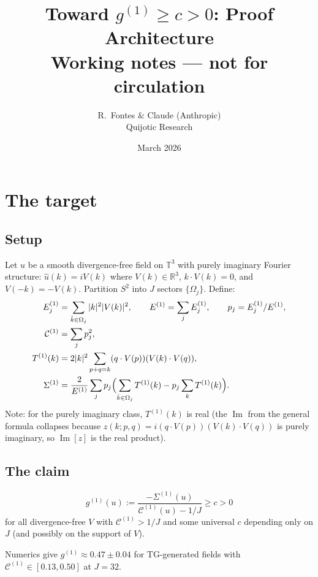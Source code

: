 \documentclass[11pt]{article}
\title{Toward $g^{(1)}\geq c > 0$: Proof Architecture\\
{\large Working notes --- not for circulation}}
\author{R.\ Fontes \& Claude (Anthropic)\\
Quijotic Research}
\date{March 2026}
\theoremstyle{definition}
\newcommand{\R}{\mathbb{R}}
\newcommand{\T}{\mathbb{T}}
\newcommand{\cC}{\mathcal{C}}
\DeclareMathOperator{\im}{Im}
\begin{document}
\maketitle

\section{The target}

\subsection{Setup}

Let $u$ be a smooth divergence-free field on $\T^3$
with purely imaginary Fourier structure:
$\hat u(k) = iV(k)$ where $V(k)\in\R^3$,
$k\cdot V(k)=0$, and $V(-k)=-V(k)$.
Partition $S^2$ into $J$ sectors $\{\Omega_j\}$.
Define:
\begin{align}
E_j^{(1)} &= \sum_{\hat k\in\Omega_j}|k|^2|V(k)|^2,
\qquad E^{(1)} = \sum_j E_j^{(1)}, \qquad
p_j = E_j^{(1)}/E^{(1)}, \\
\cC^{(1)} &= \sum_j p_j^2, \\
T^{(1)}(k) &= 2|k|^2\sum_{p+q=k}
(q\cdot V(p))(V(k)\cdot V(q)),
\label{eq:T1}\\
\Sigma^{(1)} &= \frac{2}{E^{(1)}}
\sum_j p_j\Bigl(\sum_{\hat k\in\Omega_j}T^{(1)}(k)
- p_j\sum_k T^{(1)}(k)\Bigr).
\label{eq:Sigma1}
\end{align}
Note: for the purely imaginary class,
$T^{(1)}(k)$ is real (the $\im$ from the general
formula collapses because $z(k;p,q) =
i(q\cdot V(p))(V(k)\cdot V(q))$ is purely
imaginary, so $\im[z]$ is the real product).

\subsection{The claim}

\begin{equation}\label{eq:target}
\boxed{g^{(1)}(u) :=
\frac{-\Sigma^{(1)}(u)}{\cC^{(1)}(u)-1/J}
\geq c > 0}
\end{equation}
for all divergence-free $V$ with
$\cC^{(1)}>1/J$ and some universal $c$
depending only on $J$ (and possibly on the
support of $V$).

Numerics give $g^{(1)}\approx 0.47\pm 0.04$
for TG-generated fields with
$\cC^{(1)}\in[0.13, 0.50]$ at $J=32$.
\end{document}
